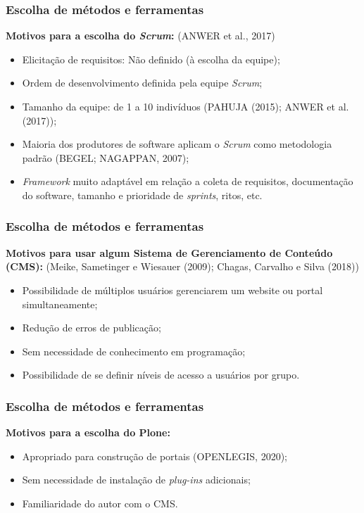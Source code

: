 \documentclass[xcolor=table]{beamer}
\begin{document}
\begin{frame}
 \frametitle{Escolha de métodos e ferramentas}
    \textbf{Motivos para a escolha do \textit{Scrum}:} (ANWER et al., 2017)
    \begin{itemize}
        \item Elicitação de requisitos: Não definido (à escolha da equipe); %
        \item Ordem de desenvolvimento definida pela equipe \textit{Scrum}; %
        \item Tamanho da equipe: de 1 a 10 indivíduos (PAHUJA (2015); ANWER et al. (2017)); %
        \item Maioria dos produtores de software aplicam o \textit{Scrum} como metodologia padrão (BEGEL; NAGAPPAN, 2007);
        \item \textit{Framework} muito adaptável em relação a coleta de requisitos, documentação do software, tamanho e prioridade de \textit{sprints}, ritos, etc.  
    \end{itemize}
\end{frame}



\begin{frame}
    \frametitle{Escolha de métodos e ferramentas}
    \textbf{Motivos para usar algum Sistema de Gerenciamento de Conteúdo (CMS):} (Meike, Sametinger e Wiesauer (2009); Chagas, Carvalho e Silva (2018))
    \begin{itemize}
        \item Possibilidade de múltiplos usuários gerenciarem um website ou portal simultaneamente;
        \item Redução de erros de publicação; %
        \item Sem necessidade de conhecimento em programação; %
        \item Possibilidade de se definir níveis de acesso a usuários por grupo. %
    \end{itemize}
\end{frame}

\begin{frame}
    \frametitle{Escolha de métodos e ferramentas}
    \textbf{Motivos para a escolha do Plone:}
    \begin{itemize}
        \item Apropriado para construção de portais (OPENLEGIS, 2020); %
        \item Sem necessidade de instalação de \textit{plug-ins} adicionais; %
        \item Familiaridade do autor com o CMS.
    \end{itemize}
\end{frame}
\end{document}
